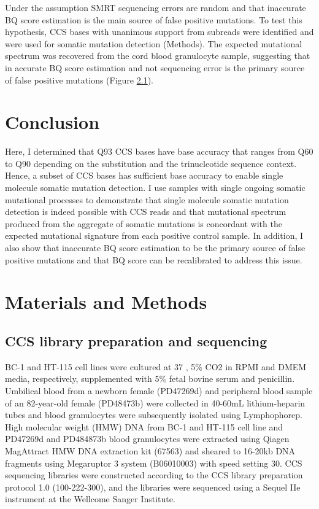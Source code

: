 
Under the assumption SMRT sequencing errors are random and that inaccurate BQ score estimation is the main source of false positive mutations. To test this hypothesis, CCS bases with unanimous support from subreads were identified and were used for somatic mutation detection (Methods). The expected mutational spectrum was recovered from the cord blood granulocyte sample, suggesting that in accurate BQ score estimation and not sequencing error is the primary source of false positive mutations (Figure \ref{}). 



\section{Conclusion}

Here, I determined that Q93 CCS bases have base accuracy that ranges from Q60 to Q90 depending on the substitution and the trinucleotide sequence context. Hence, a subset of CCS bases has sufficient base accuracy to enable single molecule somatic mutation detection. I use samples with single ongoing somatic mutational processes to demonstrate that single molecule somatic mutation detection is indeed possible with CCS reads and that mutational spectrum produced from the aggregate of somatic mutations is concordant with the expected mutational signature from each positive control sample. In addition, I also show that inaccurate BQ score estimation to be the primary source of false positive mutations and that BQ score can be recalibrated to address this issue. 

\section{Materials and Methods}

\subsection{CCS library preparation and sequencing}


BC-1 and HT-115 cell lines were cultured at 37 \textcelsius, 5\% CO2 in RPMI and DMEM media, respectively, supplemented with 5\% fetal bovine serum and penicillin. Umbilical blood from a newborn female (PD47269d) and peripheral blood sample of an 82-year-old female (PD48473b) were collected in 40-60mL lithium-heparin tubes and blood granulocytes were subsequently isolated using Lymphophorep. High molecular weight (HMW) DNA from BC-1 and HT-115 cell line and PD47269d and PD484873b blood granulocytes were extracted using Qiagen MagAttract HMW DNA extraction kit (67563) and sheared to 16-20kb DNA fragments using Megaruptor 3 system (B06010003) with speed setting 30. CCS sequencing libraries were constructed according to the CCS library preparation protocol 1.0 (100-222-300), and the libraries were sequenced using a Sequel IIe instrument at the Wellcome Sanger Institute. 

